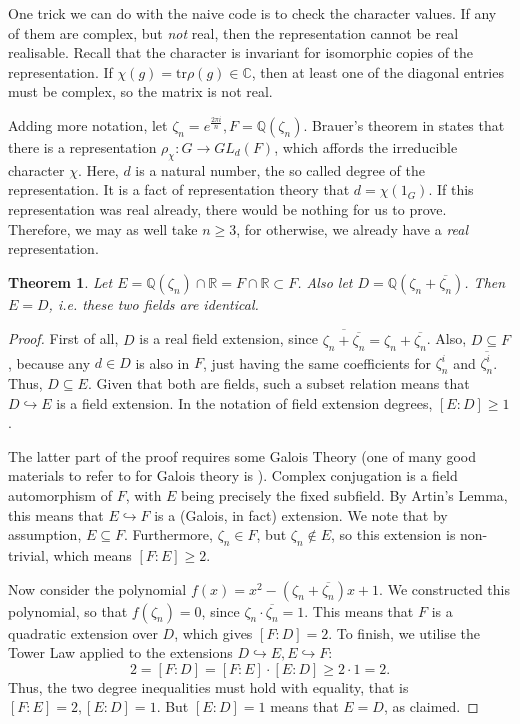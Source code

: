 \documentclass[11pt]{article}
\newtheorem{theorem}{Theorem}[section]
\begin{document}
One trick we can do with the naive code is to check the character values. If any of them are
complex, but \textit{not} real, then the representation cannot be real realisable. Recall that
the character is invariant for isomorphic copies of the representation. If
$\chi(g) = \text{tr}\rho(g) \in \mathbb{C}$, then at least one of the diagonal entries
must be complex, so the matrix is not real.

Adding more notation, let $\zeta_n = e^{\frac{2\pi i}{n}}, F=\mathbb{Q}(\zeta_n)$.
Brauer's theorem in \cite[(10.3)]{ISAACS} states that there is a
representation $\rho_\chi: G \rightarrow GL_d(F)$, which affords the irreducible
character $\chi$. Here, $d$ is a natural number, the so called degree of the
representation. It is a fact of representation theory that $d = \chi(1_G)$.
If this representation was real already, there would be nothing for us to prove.
Therefore, we may as well take $n \geq 3$, for otherwise, we already have a
\textit{real} representation.

\begin{theorem}
  Let $E = \mathbb{Q}(\zeta_n) \cap \mathbb{R} = F \cap \mathbb{R} \subset F$.
  Also let $D = \mathbb{Q}(\zeta_n + \overline{\zeta_n})$.
  Then $E = D$, i.e. these two fields are identical.
\end{theorem}
\begin{proof}
  First of all, $D$ is a real field extension, since $\overline{\zeta_n + \overline{\zeta_n}} = \zeta_n + \overline{\zeta_n}$.
  Also, $D \subseteq F$, because any $d \in D$ is also in $F$, just having the same coefficients for $\zeta_n^i$ and $\overline{\zeta_n^i}$.
  Thus, $D \subseteq E$. Given that both are fields, such a subset relation means that $D \hookrightarrow E$ is a field extension.
  In the notation of field extension degrees, $[E:D] \geq 1$.

  The latter part of the proof requires some Galois Theory (one of many good
  materials to refer to for Galois theory is \cite{milne2022}).
  Complex conjugation is a field automorphism of $F$, with $E$ being precisely
  the fixed subfield.   By Artin's Lemma, this means that $E \hookrightarrow F$
  is a (Galois, in fact) extension. We note that by assumption, $E \subseteq F$.
  Furthermore, $\zeta_n \in F$, but $\zeta_n \notin E$, so this extension is
  non-trivial, which means $[F:E] \geq 2$.

  Now consider the polynomial $f(x) = x^2 - (\zeta_n + \overline{\zeta_n})x + 1$. We constructed this
  polynomial, so that $f(\zeta_n) = 0$, since $\zeta_n \cdot \overline{\zeta_n} = 1$. This means
  that $F$ is a quadratic extension over $D$, which gives $[F:D] = 2$. To finish, we utilise the Tower Law
  applied to the extensions $D \hookrightarrow E, E \hookrightarrow F$:
  \[2 = [F:D] = [F:E] \cdot [E:D] \geq 2 \cdot 1 = 2.\]
  Thus, the two degree inequalities must hold with equality, that is $[F:E] = 2, [E:D] = 1$.
  But $[E:D] = 1$ means that $E = D$, as claimed.
\end{proof}
\end{document}
